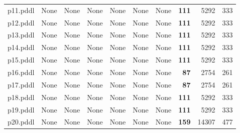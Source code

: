\documentclass{article}
\begin{document}
\begin{tabular}{@{}lrrrrrrrrr@{}}
p11.pddl & \multicolumn{1}{|l|}{None} & \multicolumn{1}{|l|}{None} & \multicolumn{1}{|l|}{None} & \multicolumn{1}{|l|}{None} & \multicolumn{1}{|l|}{None} & \multicolumn{1}{|l|}{None} & \textbf{111} & 5292 & 333 \\
p12.pddl & \multicolumn{1}{|l|}{None} & \multicolumn{1}{|l|}{None} & \multicolumn{1}{|l|}{None} & \multicolumn{1}{|l|}{None} & \multicolumn{1}{|l|}{None} & \multicolumn{1}{|l|}{None} & \textbf{111} & 5292 & 333 \\
p13.pddl & \multicolumn{1}{|l|}{None} & \multicolumn{1}{|l|}{None} & \multicolumn{1}{|l|}{None} & \multicolumn{1}{|l|}{None} & \multicolumn{1}{|l|}{None} & \multicolumn{1}{|l|}{None} & \textbf{111} & 5292 & 333 \\
p14.pddl & \multicolumn{1}{|l|}{None} & \multicolumn{1}{|l|}{None} & \multicolumn{1}{|l|}{None} & \multicolumn{1}{|l|}{None} & \multicolumn{1}{|l|}{None} & \multicolumn{1}{|l|}{None} & \textbf{111} & 5292 & 333 \\
p15.pddl & \multicolumn{1}{|l|}{None} & \multicolumn{1}{|l|}{None} & \multicolumn{1}{|l|}{None} & \multicolumn{1}{|l|}{None} & \multicolumn{1}{|l|}{None} & \multicolumn{1}{|l|}{None} & \textbf{111} & 5292 & 333 \\
p16.pddl & \multicolumn{1}{|l|}{None} & \multicolumn{1}{|l|}{None} & \multicolumn{1}{|l|}{None} & \multicolumn{1}{|l|}{None} & \multicolumn{1}{|l|}{None} & \multicolumn{1}{|l|}{None} & \textbf{87} & 2754 & 261 \\
p17.pddl & \multicolumn{1}{|l|}{None} & \multicolumn{1}{|l|}{None} & \multicolumn{1}{|l|}{None} & \multicolumn{1}{|l|}{None} & \multicolumn{1}{|l|}{None} & \multicolumn{1}{|l|}{None} & \textbf{87} & 2754 & 261 \\
p18.pddl & \multicolumn{1}{|l|}{None} & \multicolumn{1}{|l|}{None} & \multicolumn{1}{|l|}{None} & \multicolumn{1}{|l|}{None} & \multicolumn{1}{|l|}{None} & \multicolumn{1}{|l|}{None} & \textbf{111} & 5292 & 333 \\
p19.pddl & \multicolumn{1}{|l|}{None} & \multicolumn{1}{|l|}{None} & \multicolumn{1}{|l|}{None} & \multicolumn{1}{|l|}{None} & \multicolumn{1}{|l|}{None} & \multicolumn{1}{|l|}{None} & \textbf{111} & 5292 & 333 \\
p20.pddl & \multicolumn{1}{|l|}{None} & \multicolumn{1}{|l|}{None} & \multicolumn{1}{|l|}{None} & \multicolumn{1}{|l|}{None} & \multicolumn{1}{|l|}{None} & \multicolumn{1}{|l|}{None} & \textbf{159} & 14307 & 477 \\
\end{tabular}
\end{document}
